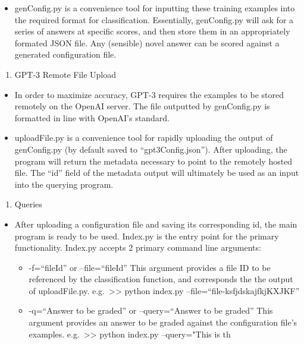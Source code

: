 \documentclass[
]{article}
\providecommand{\tightlist}{%
  \setlength{\itemsep}{0pt}\setlength{\parskip}{0pt}}
\begin{document}
\begin{itemize}
\tightlist
\item
  genConfig.py is a convenience tool for inputting these training
  examples into the required format for classification. Essentially,
  genConfig.py will ask for a series of answers at specific scores, and
  then store them in an appropriately formated JSON file. Any (sensible)
  novel answer can be scored against a generated configuration file.
\end{itemize}

\begin{enumerate}
\def\labelenumi{\arabic{enumi}.}
\setcounter{enumi}{2}
\tightlist
\item
  GPT-3 Remote File Upload
\end{enumerate}

\begin{itemize}
\item
  In order to maximize accuracy, GPT-3 requires the examples to be
  stored remotely on the OpenAI server. The file outputted by
  genConfig.py is formatted in line with OpenAI's standard.
\item
  uploadFile.py is a convenience tool for rapidly uploading the output
  of genConfig.py (by default saved to ``gpt3Config.json''). After
  uploading, the program will return the metadata necessary to point to
  the remotely hosted file. The ``id'' field of the metadata output will
  ultimately be used as an input into the querying program.
\end{itemize}

\begin{enumerate}
\def\labelenumi{\arabic{enumi}.}
\setcounter{enumi}{3}
\tightlist
\item
  Queries
\end{enumerate}

\begin{itemize}
\item
  After uploading a configuration file and saving its corresponding id,
  the main program is ready to be used. Index.py is the entry point for
  the primary functionality. Index.py accepts 2 primary command line
  arguments:

  \begin{itemize}
  \item
    -f=``fileId'' or --file=``fileId'' This argument provides a file ID
    to be referenced by the classification function, and corresponds the
    the output of uploadFile.py. e.g.~\textgreater\textgreater{} python
    index.py --file=``file-ksfjdskajfkjKXJKF''
  \item
    -q=``Answer to be graded'' or --query=``Answer to be graded'' This
    argument provides an answer to be graded against the configuration
    file's examples. e.g.~\textgreater\textgreater{} python index.py
    --query="This is th
  \end{itemize}
\end{itemize}
\end{document}

